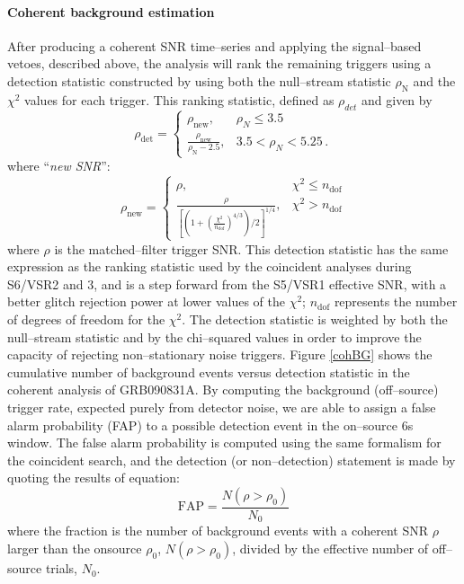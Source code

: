 \paragraph{Coherent background estimation}
After producing a coherent SNR time--series and applying the signal--based vetoes, described above, the analysis will rank the remaining triggers using a detection statistic constructed by using both the null--stream statistic $\rho_{\mathrm{N}}$ and the $\chi^2$ values for each trigger. This ranking statistic, defined as $\rho_{det}$ and given by
%
\begin{equation}\label{eq:rho_det}
\rho_{\mathrm{det}} =  \left\{
\begin{array}{ll}
 \displaystyle \rho_{\mathrm{new}} , & \rho_{N} \le 3.5 \\[0.1in]
 \displaystyle \frac{\rho_{\mathrm{new}}}{\rho_{\mathrm{N}} - 2.5} ,
 & 3.5 < \rho_{N} < 5.25 \, .
\end{array}
\right.
\end{equation}
%
where ``\textit{new SNR}'':
%
\begin{equation}
 \rho_{\mathrm{new}} = \left\{
\begin{array}{cl}
\displaystyle \rho, & \chi^2 \le n_{\mathrm{dof}} \\[0.1in]
\displaystyle \frac{\rho}{\left[\left(1 +
\left(\frac{\chi^2}{n_{\mathrm{dof}}}\right)^{4/3}\right)/2\right]^{1/4}}, & \chi^2 >
n_{\mathrm{dof}}
\end{array}
\right.
\end{equation}
%
where $\rho$ is the matched--filter trigger SNR. This detection statistic has the same expression as the ranking statistic used by the coincident analyses during S6/VSR2 and 3, and is a step forward from the S5/VSR1 effective SNR, with a better glitch rejection power at lower values of the $\chi^2$; $n_{\mathrm{dof}}$ represents the number of degrees of freedom for the $\chi^2$. The detection statistic is weighted by both the null--stream statistic and by the chi--squared values in order to improve the capacity of rejecting non--stationary noise triggers. Figure \ref{cohBG} shows the cumulative number of background events versus detection statistic in the coherent analysis of GRB090831A. By computing the background (off--source) trigger rate, expected purely from detector noise, we are able to assign a false alarm probability (FAP) to a possible detection event in the on--source 6s window. The false alarm probability is computed using the same formalism for the coincident search, and the detection (or non--detection) statement is made by quoting the results of equation:
%
\begin{equation}
\mathrm{FAP} = \frac {N(\rho>\rho_0)}{N_0}
\end{equation}
%
where the fraction is the number of background events with a coherent SNR $\rho$ larger than the onsource $\rho_0$, $N(\rho>\rho_0)$, divided by the effective number of off--source trials, $N_0$.

